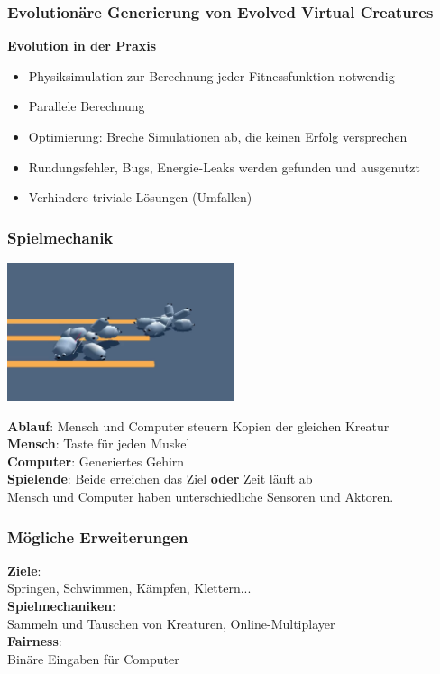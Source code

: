 \documentclass{beamer}
\begin{document}
\begin{frame}
	\frametitle{Evolutionäre Generierung von Evolved Virtual Creatures}
	
	\textbf{Evolution in der Praxis}
	\begin{itemize}
		\item Physiksimulation zur Berechnung jeder Fitnessfunktion notwendig
		\item Parallele Berechnung
		\item Optimierung: Breche Simulationen ab, die keinen Erfolg versprechen
		\item Rundungsfehler, Bugs, Energie-Leaks werden gefunden und ausgenutzt
		\item Verhindere triviale Lösungen (Umfallen)
	\end{itemize}
\end{frame}



\begin{frame}
	\frametitle{Spielmechanik}
	
	\includegraphics[width=0.5\textwidth]{img/games/darwin.png}
	\vspace{1em}
	
	\textbf{Ablauf}: Mensch und Computer steuern Kopien der gleichen Kreatur \\
	\vspace{1em}
	\textbf{Mensch}: Taste für jeden Muskel \\
	\textbf{Computer}: Generiertes Gehirn \\
	\vspace{1em}
	\textbf{Spielende}: Beide erreichen das Ziel \textbf{oder} Zeit läuft ab \\
	\vspace{1em}
	Mensch und Computer haben unterschiedliche Sensoren und Aktoren.
\end{frame}


\begin{frame}
	\frametitle{Mögliche Erweiterungen}
	
	\textbf{Ziele}:\\ Springen, Schwimmen, Kämpfen, Klettern... \\
	\vspace{2em}
	\textbf{Spielmechaniken}:\\ Sammeln und Tauschen von Kreaturen, Online-Multiplayer \\
	\vspace{2em}
	\textbf{Fairness}:\\ Binäre Eingaben für Computer
\end{frame}
\end{document}
